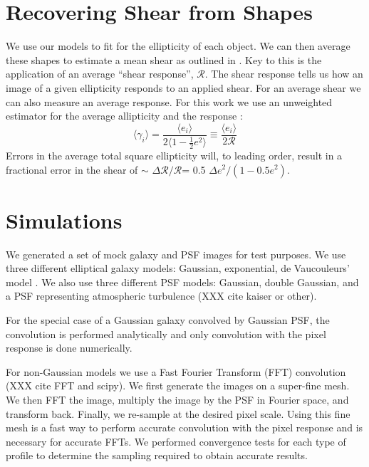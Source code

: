 \documentclass[12pt,preprint]{aastex}
\newcommand{\Rshear}{\ensuremath{\mathcal{R}}}
\newcommand{\rfracerr}{\ensuremath{\Delta \Rshear/\Rshear}}
\begin{document}
\section{Recovering Shear from Shapes}

We use our models to fit for the ellipticity of each object.  We can then
average these shapes to estimate a mean shear as outlined in \citet{bern02}.
Key to this is the application of an average ``shear response'', \Rshear.  The
shear response tells us how an image of a given ellipticity responds to an
applied shear.  For an average shear we can also measure an average response.
For this work we use an unweighted estimator for the average allipticity and
the response \citep[see e.g.  Equation 5.11,][]{bern02}:
\begin{equation} \label{eq:shearest}
\langle \gamma_i \rangle  = \frac{\langle e_i \rangle}{2 \langle 1 - \frac{1}{2} e^2 \rangle } \equiv
  \frac{\langle e_i \rangle}{2 \Rshear} 
\end{equation}
\noindent Errors in the average total square ellipticity will, to leading
order, result in a fractional error in the shear of $\sim$ \rfracerr = 
0.5 $\Delta e^2/(1-0.5 e^2)$.

\section{Simulations} \label{sec:sim}

We generated a set of mock galaxy and PSF images for test purposes.  We use
three different elliptical galaxy models: Gaussian, exponential, de
Vaucouleurs' model \citep{devauc1948}.  We also use three different PSF models:
Gaussian, double Gaussian, and a PSF representing atmospheric turbulence (XXX
cite kaiser or other).

For the special case of a Gaussian galaxy convolved by Gaussian PSF, the
convolution is performed analytically and only convolution with the pixel
response is done numerically.  

For non-Gaussian models we use a Fast Fourier Transform (FFT) convolution (XXX
cite FFT and scipy).  We first generate the images on a super-fine mesh. We
then FFT the image, multiply the image by the PSF in Fourier space, and
transform back. Finally, we re-sample at the desired pixel scale.  Using this
fine mesh is a fast way to perform accurate convolution with the pixel response
and is necessary for accurate FFTs.  We performed convergence tests for each
type of profile to determine the sampling required to obtain accurate results.
\end{document}
